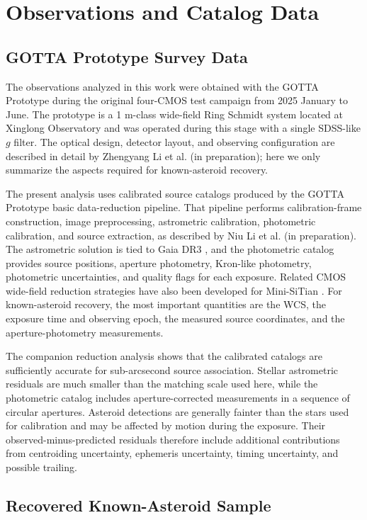 \documentclass[referee]{raa}
\begin{document}
\section{Observations and Catalog Data}
\label{sec:data}

\subsection{GOTTA Prototype Survey Data}

The observations analyzed in this work were obtained with the GOTTA Prototype during the original four-CMOS test campaign from 2025 January to June. The prototype is a 1 m-class wide-field Ring Schmidt system located at Xinglong Observatory and was operated during this stage with a single SDSS-like $g$ filter. The optical design, detector layout, and observing configuration are described in detail by Zhengyang Li et al. (in preparation); here we only summarize the aspects required for known-asteroid recovery.

The present analysis uses calibrated source catalogs produced by the GOTTA Prototype basic data-reduction pipeline. That pipeline performs calibration-frame construction, image preprocessing, astrometric calibration, photometric calibration, and source extraction, as described by Niu Li et al. (in preparation). The astrometric solution is tied to Gaia DR3 \citep{Gaia2023}, and the photometric catalog provides source positions, aperture photometry, Kron-like photometry, photometric uncertainties, and quality flags for each exposure. Related CMOS wide-field reduction strategies have also been developed for Mini-SiTian \citep{Xiao2025}. For known-asteroid recovery, the most important quantities are the WCS, the exposure time and observing epoch, the measured source coordinates, and the aperture-photometry measurements.

The companion reduction analysis shows that the calibrated catalogs are sufficiently accurate for sub-arcsecond source association. Stellar astrometric residuals are much smaller than the matching scale used here, while the photometric catalog includes aperture-corrected measurements in a sequence of circular apertures. Asteroid detections are generally fainter than the stars used for calibration and may be affected by motion during the exposure. Their observed-minus-predicted residuals therefore include additional contributions from centroiding uncertainty, ephemeris uncertainty, timing uncertainty, and possible trailing.

\subsection{Recovered Known-Asteroid Sample}
\end{document}
